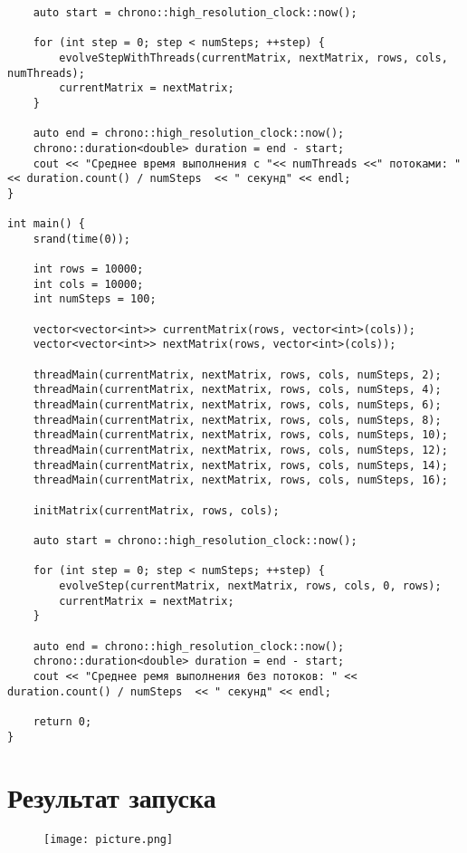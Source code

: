 \documentclass[a4paper, 14pt]{extarticle}
\begin{document}
\begin{verbatim}
    auto start = chrono::high_resolution_clock::now();

    for (int step = 0; step < numSteps; ++step) {
        evolveStepWithThreads(currentMatrix, nextMatrix, rows, cols, numThreads);
        currentMatrix = nextMatrix;
    }

    auto end = chrono::high_resolution_clock::now();
    chrono::duration<double> duration = end - start;
    cout << "Среднее время выполнения с "<< numThreads <<" потоками: " << duration.count() / numSteps  << " секунд" << endl;
}

int main() {
    srand(time(0));

    int rows = 10000;
    int cols = 10000;
    int numSteps = 100;

    vector<vector<int>> currentMatrix(rows, vector<int>(cols));
    vector<vector<int>> nextMatrix(rows, vector<int>(cols));

    threadMain(currentMatrix, nextMatrix, rows, cols, numSteps, 2);
    threadMain(currentMatrix, nextMatrix, rows, cols, numSteps, 4);
    threadMain(currentMatrix, nextMatrix, rows, cols, numSteps, 6);
    threadMain(currentMatrix, nextMatrix, rows, cols, numSteps, 8);
    threadMain(currentMatrix, nextMatrix, rows, cols, numSteps, 10);
    threadMain(currentMatrix, nextMatrix, rows, cols, numSteps, 12);
    threadMain(currentMatrix, nextMatrix, rows, cols, numSteps, 14);
    threadMain(currentMatrix, nextMatrix, rows, cols, numSteps, 16);

    initMatrix(currentMatrix, rows, cols);

    auto start = chrono::high_resolution_clock::now();

    for (int step = 0; step < numSteps; ++step) {
        evolveStep(currentMatrix, nextMatrix, rows, cols, 0, rows);
        currentMatrix = nextMatrix;
    }

    auto end = chrono::high_resolution_clock::now();
    chrono::duration<double> duration = end - start;
    cout << "Среднее ремя выполнения без потоков: " << duration.count() / numSteps  << " секунд" << endl;

    return 0;
}

\end{verbatim}

\section{Результат запуска}
    
\begin{figure}[H]
	\centering
	\texttt{[image: picture.png]}
\label{fig:picture.png}
\end{figure}
\end{document}
